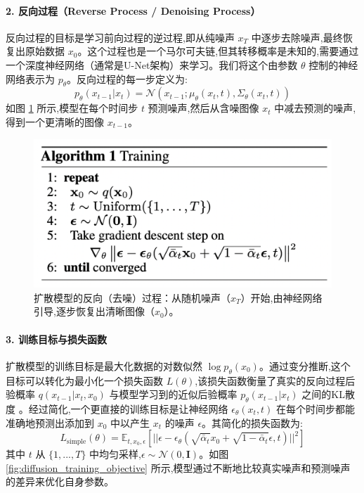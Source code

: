 \begin{itemize}
    \paragraph{2. 反向过程（Reverse Process / Denoising Process）}
    反向过程的目标是学习前向过程的逆过程,即从纯噪声 $x_T$ 中逐步去除噪声,最终恢复出原始数据 $x_0$。这个过程也是一个马尔可夫链,但其转移概率是未知的,需要通过一个深度神经网络（通常是U-Net架构）来学习。我们将这个由参数 $\theta$ 控制的神经网络表示为 $p_\theta$。反向过程的每一步定义为:
    $$ p_\theta(x_{t-1} | x_t) = \mathcal{N}(x_{t-1}; \mu_\theta(x_t, t), \Sigma_\theta(x_t, t)) $$
    如图 \ref{fig:diffusion_reverse_process} 所示,模型在每个时间步 $t$ 预测噪声,然后从含噪图像 $x_t$ 中减去预测的噪声,得到一个更清晰的图像 $x_{t-1}$。
    
    \begin{figure}[htbp]
        \centering
        \includegraphics[width=\textwidth]{figures/D2.png}
        \caption{扩散模型的反向（去噪）过程：从随机噪声（$x_T$）开始,由神经网络引导,逐步恢复出清晰图像（$x_0$）。}
        \label{fig:diffusion_reverse_process}
    \end{figure}

    \paragraph{3. 训练目标与损失函数}
    扩散模型的训练目标是最大化数据的对数似然 $\log p_\theta(x_0)$。通过变分推断,这个目标可以转化为最小化一个损失函数 $L(\theta)$,该损失函数衡量了真实的反向过程后验概率 $q(x_{t-1} | x_t, x_0)$ 与模型学习到的近似后验概率 $p_\theta(x_{t-1} | x_t)$ 之间的KL散度 。经过简化,一个更直接的训练目标是让神经网络 $\epsilon_\theta(x_t, t)$ 在每个时间步都能准确地预测出添加到 $x_0$ 中以产生 $x_t$ 的噪声 $\epsilon$。其简化的损失函数为:
    $$ L_{\text{simple}}(\theta) = \mathbb{E}_{t, x_0, \epsilon} \left[ || \epsilon - \epsilon_\theta(\sqrt{\bar{\alpha}_t}x_0 + \sqrt{1 - \bar{\alpha}_t}\epsilon, t) ||^2 \right] $$
    其中 $t$ 从 $\{1, ..., T\}$ 中均匀采样,$\epsilon \sim \mathcal{N}(0, \mathbf{I})$。如图 \ref{fig:diffusion_training_objective} 所示,模型通过不断地比较真实噪声和预测噪声的差异来优化自身参数。
    

\end{itemize}

